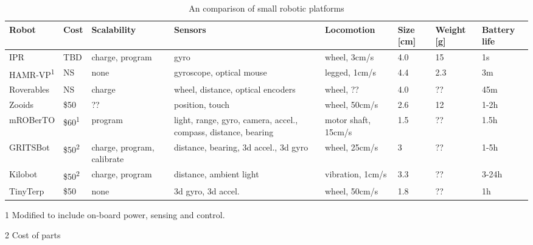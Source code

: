 


\begin{table*}[t]
	\centering
	\tiny
	\begin{threeparttable}
		\caption{An comparison of small robotic platforms}
		\label{tab:1}
 		\begin{tabularx}{\textwidth}{l l X X X l l l} 
			\hline
 			Robot & Cost & Scalability & Sensors & Locomotion & Size [cm] & Weight [g] & Battery life \\ 
 			\hline
 			IPR & TBD & charge, program & gyro & wheel, 3cm/s & 4.0 & 15 & 1s\\
 			HAMR-VP\textsuperscript{1} \cite{bruhwiler_iros_2015} & NS & none & gyroscope, optical mouse & legged, 1cm/s & 4.4 & 2.3 & 3m \\
 			Roverables \cite{dementyev_uist_2016} & NS & charge & wheel, distance, optical encoders & wheel, ?? & 4.0 & ?? & 45m \\ 
 			Zooids \cite{legoc_uist_2016} & \$50 & ?? & position, touch & wheel, 50cm/s & 2.6 & 12 & 1-2h \\ 
 			mROBerTO \cite{kim_iros_2016} & \$60\textsuperscript{1} & program & light, range, gyro, camera, accel., compass, distance, bearing & motor shaft, 15cm/s & 1.5 & ?? & 1.5h\\
 			GRITSBot \cite{pickem_icra_2015} & \$50\textsuperscript{2} & charge, program, calibrate & distance, bearing, 3d accel., 3d gyro & wheel, 25cm/s & 3 & ?? & 1-5h \\
 			Kilobot \cite{rubenstein_icra_2012} & \$50\textsuperscript{2} & charge, program & distance, ambient light & vibration, 1cm/s & 3.3 & ?? & 3-24h\\
 			TinyTerp \cite{sabelhaus_icra_2013} & \$50 & none & 3d gyro, 3d accel. & wheel, 50cm/s & 1.8 & ?? & 1h\\
			\hline
		\end{tabularx}
		\begin{tablenotes}
			\item [1] Modified to include on-board power, sensing and control.
			\item [2] Cost of parts
		\end{tablenotes}
	\end{threeparttable}
\end{table*}